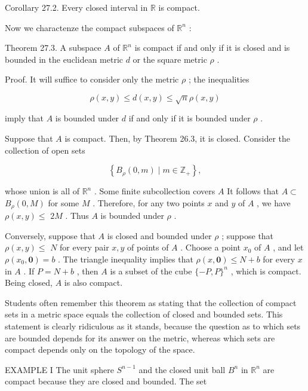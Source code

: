 Corollary 27.2. Every closed interval in \(\mathbb{R}\) is compact.

Now we charactenze the compact subspaces of \({\mathbb{R}}^{n}\) :

Theorem 27.3. A subspace \(A\) of \({\mathbb{R}}^{n}\) is compact if and only if it is closed and is bounded in the euclidean metric \(d\) or the square metric \(\rho\) .

Proof. It will suffice to consider only the metric \(\rho\) ; the inequalities

\[
\rho \left( {x,y}\right)  \leq  d\left( {x,y}\right)  \leq  \sqrt{n}\rho \left( {x,y}\right)
\]

imply that \(A\) is bounded under \(d\) if and only if it is bounded under \(\rho\) .

Suppose that \(A\) is compact. Then, by Theorem 26.3, it is closed. Consider the collection of open sets

\[
\left\{  {{B}_{\rho }\left( {0,m}\right)  \mid  m \in  {\mathbb{Z}}_{ + }}\right\}  ,
\]

whose union is all of \({\mathbb{R}}^{n}\) . Some finite subcollection covers \(A\) It follows that \(A \subset\)  \({B}_{\rho }\left( {0,M}\right)\) for some \(M\) . Therefore, for any two points \(x\) and \(y\) of \(A\) , we have \(\rho \left( {x,y}\right)  \leq\)  \({2M}\) . Thus \(A\) is bounded under \(\rho\) .

Conversely, suppose that \(A\) is closed and bounded under \(\rho\) ; suppose that \(\rho \left( {x,y}\right)  \leq\)  \(N\) for every pair \(x,y\) of points of \(A\) . Choose a point \({x}_{0}\) of \(A\) , and let \(\rho \left( {{x}_{0},\mathbf{0}}\right)  = b\) . The triangle inequality implies that \(\rho \left( {x,\mathbf{0}}\right)  \leq  N + b\) for every \(x\) in \(A\) . If \(P = N + b\) , then \(A\) is a subset of the cube \(\{  - P,P{\} }^{n}\) , which is compact. Being closed, \(A\) is also compact.

Students often remember this theorem as stating that the collection of compact sets in a metric space equals the collection of closed and bounded sets. This statement is clearly ridiculous as it stands, because the question as to which sets are bounded depends for its answer on the metric, whereas which sets are compact depends only on the topology of the space.

EXAMPLE I The unit sphere \({S}^{n - 1}\) and the closed unit ball \({B}^{n}\) in \({\mathbb{R}}^{n}\) are compact because they are closed and bounded. The set

